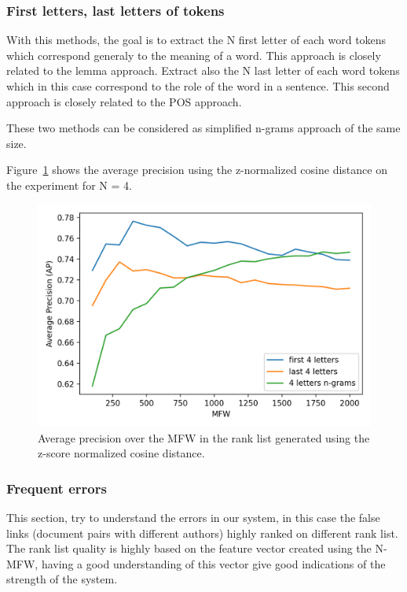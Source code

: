 \subsubsection{First letters, last letters of tokens}

With this methods, the goal is to extract the N first letter of each word tokens which correspond generaly to the meaning of a word.
This approach is closely related to the lemma approach.
Extract also the N last letter of each word tokens which in this case correspond to the role of the word in a sentence.
This second approach is closely related to the POS approach.

These two methods can be considered as simplified n-grams approach of the same size.

Figure~\ref{fig:first_last_letters_ngrams} shows the average precision using the z-normalized cosine distance on the experiment for N = 4.

\begin{figure}
  \includegraphics[width=\linewidth]{img/first_last_letters_ngrams.png}
  \caption{Average precision over the MFW in the rank list generated using the z-score normalized cosine distance.}
  \label{fig:first_last_letters_ngrams}
\end{figure}


\subsubsection{Frequent errors}

This section, try to understand the errors in our system, in this case the false links (document pairs with different authors) highly ranked on different rank list.
The rank list quality is highly based on the feature vector created using the N-MFW, having a good understanding of this vector give good indications of the strength of the system.

